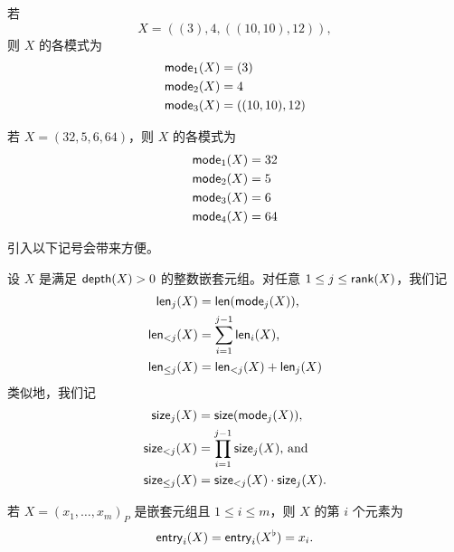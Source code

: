 \begin{example}
    若
    \[X = ((3),4,((10,10),12)),\]
    则 $X$ 的各模式为
    \begin{align*}
        \mathsf{mode}_1(X) & = (3)\\
        \mathsf{mode}_2(X) & = 4 \\
        \mathsf{mode}_3(X) & = ((10,10),12)
    \end{align*}
\end{example}

\begin{example}
    若 $X = (32,5,6,64)$，则 $X$ 的各模式为
    \begin{align*}
        \mathsf{mode}_1(X) & = 32\\
        \mathsf{mode}_2(X) & = 5 \\
        \mathsf{mode}_3(X) & = 6\\
        \mathsf{mode}_4(X) & = 64
    \end{align*}
\end{example}

\noindent 引入以下记号会带来方便。

\begin{notation}
    设 $X$ 是满足 $\mathsf{depth}(X)>0$ 的整数嵌套元组。对任意 $1 \leq j \leq \mathsf{rank}(X)$，我们记
    \begin{align*}
        \mathsf{len}_j(X) & = \mathsf{len}(\mathsf{mode}_j(X))\text{, } \\
        \mathsf{len}_{<j}(X) & = \sum_{i=1}^{j-1} \mathsf{len}_i(X)\text{,}\\
        \mathsf{len}_{\leq j}(X) & = \mathsf{len}_{<j}(X) + \mathsf{len}_j(X)
    \end{align*}
    类似地，我们记
    \begin{align*}
        \mathsf{size}_j(X) & = \mathsf{size}(\mathsf{mode}_j(X))\text{, }\\
        \mathsf{size}_{< j} (X) & = \prod_{i=1}^{j-1} \mathsf{size}_j(X)\text{, and}\\
        \mathsf{size}_{\leq j} (X) & = \mathsf{size}_{<j}(X)\cdot\mathsf{size}_j(X).
    \end{align*}
\end{notation}

\begin{definition}
    \label{definitionofentryofnestedtuple}
    若 $X = (x_1,\dots,x_m)_P$ 是嵌套元组且 $1 \leq i \leq m$，则 $X$ 的第 $i$ 个元素为
    \[
    \mathsf{entry}_i(X) = \mathsf{entry}_i(X^\flat) = x_i.
    \]
\end{definition}


